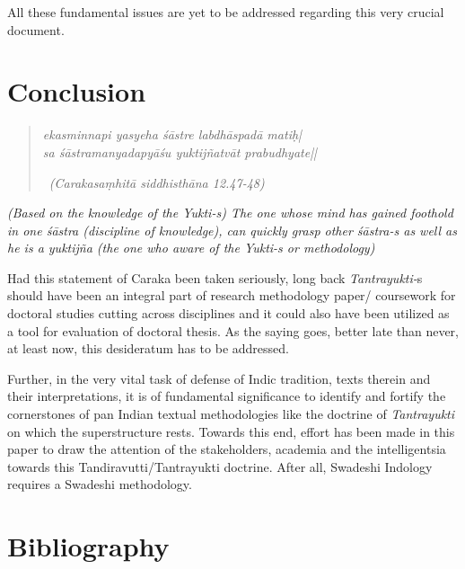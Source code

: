 All these fundamental issues are yet to be addressed regarding this very crucial document.


\section*{Conclusion}

\begin{verse}
\textit{ekasminnapi yasyeha śāstre labdhāspadā matiḥ|}\\\textit{sa śāstramanyadapyāśu yuktijñatvāt prabudhyate||}

~\hfill \textit{(Carakasaṃhitā siddhisthāna 12.47-48)}
\end{verse}

\begin{myquote}
\textit{(Based on the knowledge of the Yukti-s) The one whose mind has gained foothold in one śāstra (discipline of knowledge), can quickly grasp other śāstra-s as well as he is a yuktijña (the one who aware of the Yukti-s or methodology)}
\end{myquote}

Had this statement of Caraka been taken seriously, long back \textit{Tantra\-yukti-}s should have been an integral part of research methodology paper/ coursework for doctoral studies cutting across disciplines and it could also have been utilized as a tool for evaluation of doctoral thesis. As the saying goes, better late than never, at least now, this desideratum has to be addressed.

Further, in the very vital task of defense of Indic tradition, texts therein and their interpretations, it is of fundamental significance to identify and fortify the cornerstones of pan Indian textual methodologies like the doctrine of \textit{Tantrayukti} on which the superstructure rests. Towards this end, effort has been made in this paper to draw the attention of the stakeholders, academia and the intelligentsia towards this Tandiravutti/Tantrayukti doctrine. After all, Swadeshi Indology requires a Swadeshi methodology.


\section*{Bibliography}

